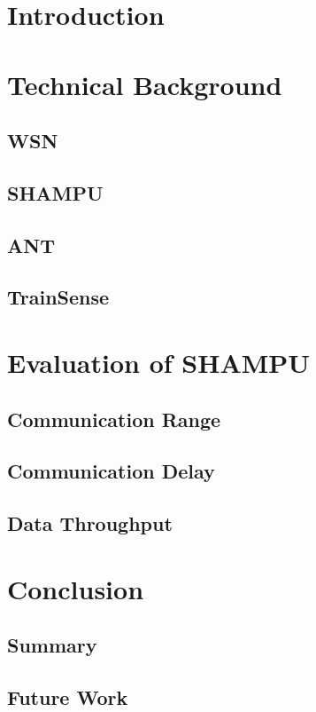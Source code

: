 \chapter{Introduction}

\chapter{Technical Background}

\section{WSN}
\section{SHAMPU}
\section{ANT}
\section{TrainSense}

\chapter{Evaluation of SHAMPU}
\section{Communication Range}
\section{Communication Delay}
\section{Data Throughput}
\cite{Beutel04}
\cite{Hopkins06}
\cite{Leopold03}
\cite{Lim13}
\cite{Smeets14}
\cite{Smeets13}

\chapter{Conclusion}
\section{Summary}
\section{Future Work}
